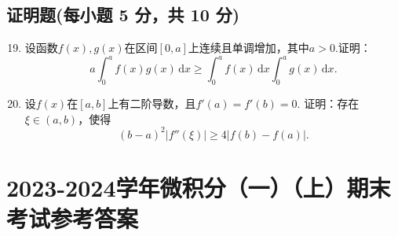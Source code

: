 \documentclass[../main.tex]{subfiles}
\begin{document}
\section{证明题(每小题 5 分，共 10 分)}
\begin{enumerate}
    \setcounter{enumi}{18}
    \item 设函数$f(x),g(x)$在区间$[0,a]$上连续且单调增加，其中$a>0$.证明：
          \[
              a\int_{0}^{a}f(x)g(x)\,\mathrm{d}x\geq \int_{0}^{a}f(x)\,\mathrm{d}x\int_{0}^{a}
              g(x)\,\mathrm{d}x.
          \]
          \vspace{9em}

    \item 设$f(x)$在$[a,b]$上有二阶导数，且$f'(a)=f'(b)=0$. 证明：存在$\xi\in
              (a,b)$，使得
          \[
              (b-a)^{2}|f''(\xi)|\geq 4|f(b)-f(a)|.
          \]
          \vspace{8em}
\end{enumerate}

\chapter{2023-2024学年微积分（一）（上）期末考试参考答案}
\end{document}
